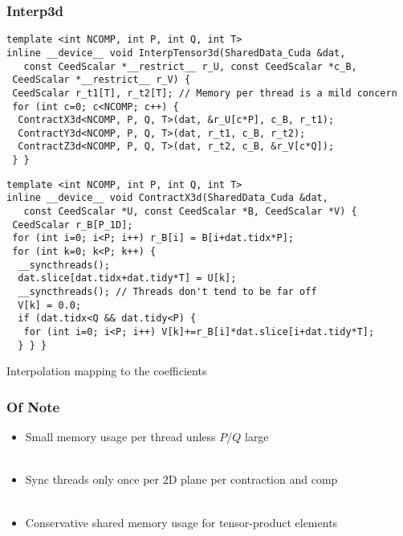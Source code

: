 \documentclass{beamer}
\begin{document}

\begin{frame}[fragile]
\begin{center}
\frametitle{Interp3d}

{\tiny
\begin{lstlisting}[style=boxedC]
template <int NCOMP, int P, int Q, int T>
inline __device__ void InterpTensor3d(SharedData_Cuda &dat,
   const CeedScalar *__restrict__ r_U, const CeedScalar *c_B,
 CeedScalar *__restrict__ r_V) {
 CeedScalar r_t1[T], r_t2[T]; // Memory per thread is a mild concern
 for (int c=0; c<NCOMP; c++) {
  ContractX3d<NCOMP, P, Q, T>(dat, &r_U[c*P], c_B, r_t1);
  ContractY3d<NCOMP, P, Q, T>(dat, r_t1, c_B, r_t2);
  ContractZ3d<NCOMP, P, Q, T>(dat, r_t2, c_B, &r_V[c*Q]);
 } }
\end{lstlisting}
}

{\tiny
\begin{lstlisting}[style=boxedC]
template <int NCOMP, int P, int Q, int T>
inline __device__ void ContractX3d(SharedData_Cuda &dat,
   const CeedScalar *U, const CeedScalar *B, CeedScalar *V) {
 CeedScalar r_B[P_1D];
 for (int i=0; i<P; i++) r_B[i] = B[i+dat.tidx*P];
 for (int k=0; k<P; k++) {
  __syncthreads();
  dat.slice[dat.tidx+dat.tidy*T] = U[k];
  __syncthreads(); // Threads don't tend to be far off
  V[k] = 0.0;
  if (dat.tidx<Q && dat.tidy<P) {
   for (int i=0; i<P; i++) V[k]+=r_B[i]*dat.slice[i+dat.tidy*T];
  } } }
\end{lstlisting}
}

Interpolation mapping to the coefficients\\

\end{center}
\end{frame}


\begin{frame}
\begin{center}
\frametitle{Of Note}

\begin{itemize}

\item Small memory usage per thread unless $P$/$Q$ large\\

~\\

\item Sync threads only once per 2D plane per contraction and comp\\

~\\

\item Conservative shared memory usage for tensor-product elements\\

\end{itemize}

\end{center}
\end{frame}
\end{document}
